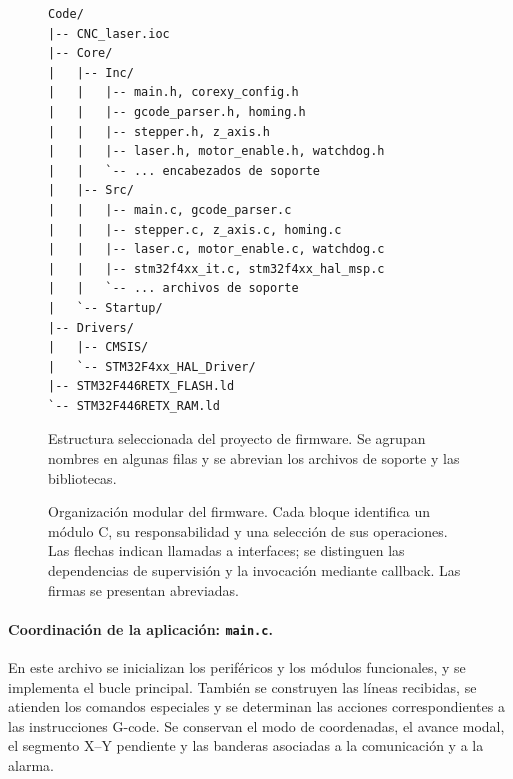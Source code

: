 \documentclass[blue,fullpaper]{ludusofficial}  %
\begin{document}
\begin{figure}[htbp]
    \centering
    \begin{minipage}{0.95\linewidth}
    \small
\begin{verbatim}
Code/
|-- CNC_laser.ioc
|-- Core/
|   |-- Inc/
|   |   |-- main.h, corexy_config.h
|   |   |-- gcode_parser.h, homing.h
|   |   |-- stepper.h, z_axis.h
|   |   |-- laser.h, motor_enable.h, watchdog.h
|   |   `-- ... encabezados de soporte
|   |-- Src/
|   |   |-- main.c, gcode_parser.c
|   |   |-- stepper.c, z_axis.c, homing.c
|   |   |-- laser.c, motor_enable.c, watchdog.c
|   |   |-- stm32f4xx_it.c, stm32f4xx_hal_msp.c
|   |   `-- ... archivos de soporte
|   `-- Startup/
|-- Drivers/
|   |-- CMSIS/
|   `-- STM32F4xx_HAL_Driver/
|-- STM32F446RETX_FLASH.ld
`-- STM32F446RETX_RAM.ld
\end{verbatim}
    \end{minipage}
    \caption{Estructura seleccionada del proyecto de firmware.
    Se agrupan nombres en algunas filas y se abrevian los archivos de soporte y las bibliotecas.}
    \label{fig:estructura-firmware}
\end{figure}

\begin{landscape}
\begin{figure}[p]
    \centering
    \resizebox{\linewidth}{!}{%
    }
    \caption{Organización modular del firmware.
    Cada bloque identifica un módulo C,
    su responsabilidad y una selección
    de sus operaciones. Las flechas indican
    llamadas a interfaces; se distinguen
    las dependencias de supervisión y
    la invocación mediante callback.
    Las firmas se presentan abreviadas.}
    \label{fig:modulos-actuales}
\end{figure}
\end{landscape}

\paragraph{Coordinación de la aplicación: \texttt{main.c}.}
En este archivo se inicializan los periféricos y los
módulos funcionales, y se implementa el bucle principal.
También se construyen las líneas recibidas, se atienden
los comandos especiales y se determinan las acciones
correspondientes a las instrucciones G-code. Se conservan
el modo de coordenadas, el avance modal, el segmento
X--Y pendiente y las banderas asociadas a la comunicación
y a la alarma.
\end{document}
